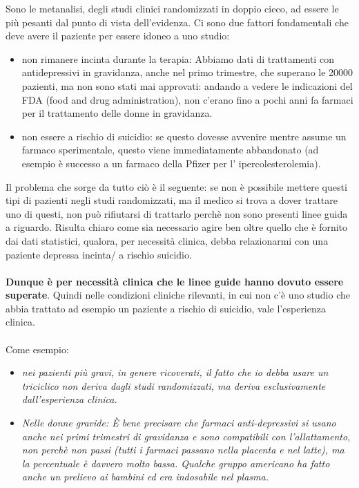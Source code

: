 Sono le metanalisi, degli studi clinici randomizzati in doppio cieco, ad
essere le più pesanti dal punto di vista dell'evidenza. Ci sono due
fattori fondamentali che deve avere il paziente per essere idoneo a uno
studio:

\begin{itemize}
\item
  non rimanere incinta durante la terapia: Abbiamo dati di trattamenti
  con antidepressivi in gravidanza, anche nel primo trimestre, che
  superano le 20000 pazienti, ma non sono stati mai approvati: andando a
  vedere le indicazioni del FDA (food and drug administration), non
  c'erano fino a pochi anni fa farmaci per il trattamento delle donne in
  gravidanza.
\item
  non essere a rischio di suicidio: se questo dovesse avvenire mentre
  assume un farmaco sperimentale, questo viene immediatamente
  abbandonato (ad esempio è successo a un farmaco della Pfizer per l'
  ipercolesterolemia).
\end{itemize}

Il problema che sorge da tutto ciò è il seguente: se non è possibile
mettere questi tipi di pazienti negli studi randomizzati, ma il medico
si trova a dover trattare uno di questi, non può rifiutarsi di trattarlo
perchè non sono presenti linee guida a riguardo. Risulta chiaro come sia
necessario agire ben oltre quello che è fornito dai dati statistici,
qualora, per necessità clinica, debba relazionarmi con una paziente
depressa incinta/ a rischio suicidio.
\\\\
\textbf{Dunque è per necessità clinica che le linee guide hanno dovuto
essere superate}. Quindi nelle condizioni cliniche rilevanti, in cui non
c'è uno studio che abbia trattato ad esempio un paziente a rischio di
suicidio, vale l'esperienza clinica.
\\\\
Come esempio:

\begin{itemize}
\item
  \emph{nei pazienti più gravi, in genere ricoverati, il fatto che io
  debba usare un triciclico non deriva dagli studi randomizzati, ma
  deriva esclusivamente dall'esperienza clinica.}
\item
  \emph{Nelle donne gravide: È bene precisare che farmaci
  anti-depressivi si usano anche nei primi trimestri di gravidanza e
  sono compatibili con l'allattamento, non perchè non passi (tutti i
  farmaci passano nella placenta e nel latte), ma la percentuale è
  davvero molto bassa. Qualche gruppo americano ha fatto anche un
  prelievo ai bambini ed era indosabile nel plasma.}
\end{itemize}

